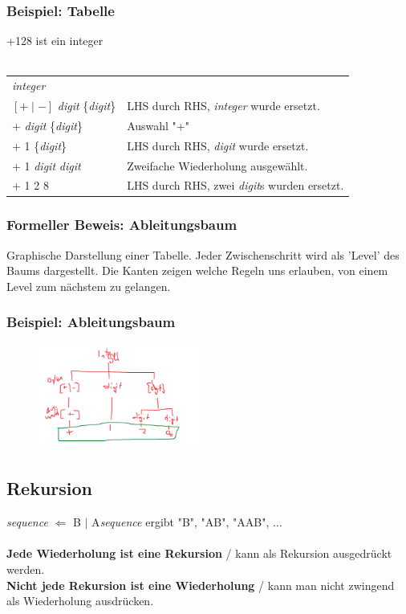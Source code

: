 \documentclass[12pt,a4paper]{article}
\begin{document}
\subsubsection{Beispiel: Tabelle}
+128 ist ein integer\\\\
\begin{tabularx}{\linewidth}{l X}
\textit{integer} & \\
$[+\mid-]$ \textit{digit} \{\textit{digit}\} & LHS durch RHS, \textit{integer} wurde ersetzt.\\
+ \textit{digit} \{\textit{digit}\} & Auswahl "+"\\
+ 1 \{\textit{digit}\} & LHS durch RHS, \textit{digit} wurde ersetzt.\\
+ 1 \textit{digit} \textit{digit} & Zweifache Wiederholung ausgewählt.\\
+ 1 2 8 & LHS durch RHS, zwei \textit{digit}s wurden ersetzt.
\end{tabularx}
\subsubsection{Formeller Beweis: Ableitungsbaum}
Graphische Darstellung einer Tabelle. Jeder Zwischenschritt wird als 'Level' des Baums dargestellt. Die Kanten zeigen welche Regeln uns erlauben, von einem Level zum nächstem zu gelangen.
\subsubsection{Beispiel: Ableitungsbaum} %
\begin{figure}[h!]
\includegraphics[width=200px]{ableitungsbaum-bsp.png}
\end{figure}
\subsection{Rekursion}
\textit{sequence} $\Leftarrow$ B $\mid$ A\textit{sequence} ergibt "B", "AB", "AAB", $\hdots$\\\\
\textbf{Jede Wiederholung ist eine Rekursion} / kann als Rekursion ausgedrückt werden.\\
\textbf{Nicht jede Rekursion ist eine Wiederholung} / kann man nicht zwingend als Wiederholung ausdrücken.
\end{document}
